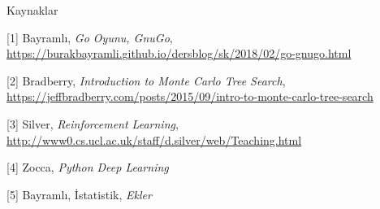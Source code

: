\documentclass[12pt,fleqn]{article}\usepackage{../../common}
\begin{document}
Kaynaklar

[1] Bayramlı, 
   {\em Go Oyunu, GnuGo}, 
   \url{https://burakbayramli.github.io/dersblog/sk/2018/02/go-gnugo.html}

[2] Bradberry, {\em Introduction to Monte Carlo Tree Search}, 
    \url{https://jeffbradberry.com/posts/2015/09/intro-to-monte-carlo-tree-search}

[3] Silver, {\em Reinforcement Learning}, 
    \url{http://www0.cs.ucl.ac.uk/staff/d.silver/web/Teaching.html}

[4] Zocca, {\em Python Deep Learning}

[5] Bayramlı, İstatistik, {\em Ekler}
\end{document}
